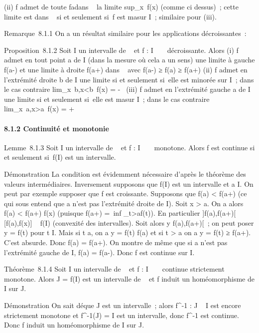\documentclass[]{article}
\begin{document}
(ii) f admet de toute fa\ccon dans
\overline{}~ la limite
sup\_x\inI~f(x) (comme ci dessus)~; cette
limite est dans ~ si et seulement si~f est ma sur I~; similaire
pour (iii).

Remarque~8.1.1 On a un résultat similaire pour les applications
décroissantes~:

Proposition~8.1.2 Soit I un intervalle de ~ et f : I \rightarrow~ ~ décroissante.
Alors (i) f admet en tout point a de I (dans la mesure où cela a un
sens) une limite à gauche f(a-) et une limite à droite f(a+) dans ~ avec
f(a-) ≥ f(a) ≥ f(a+) (ii) f admet en l'extrémité droite b de I une
limite si et seulement si~elle est minorée sur I~; dans le cas contraire
lim\_x\rightarrow~b,x\textless{}b~f(x) = -\infty~ (iii)
f admet en l'extrémité gauche a de I une limite si et seulement si~elle
est ma sur I~; dans le cas contraire
lim\_x\rightarrow~a,x\textgreater{}a~f(x) = +\infty~

\paragraph{8.1.2 Continuité et monotonie}

Lemme~8.1.3 Soit I un intervalle de ~ et f : I \rightarrow~ ~ monotone. Alors f est
continue si et seulement si~f(I) est un intervalle.

Démonstration La condition est évidemment nécessaire d'après le théorème
des valeurs intermédiaires. Inversement supposons que f(I) est un
intervalle et a \in I. On peut par exemple supposer que f est croissante.
Supposons que f(a) \textless{} f(a+) (ce qui sous entend que a n'est pas
l'extrémité droite de I). Soit x \textgreater{} a. On a alors f(a)
\textless{} f(a+) \leq f(x) (puisque f(a+) =\
inf \_t\textgreater{}af(t)). En particulier {]}f(a),f(a+){[}\subset~
{[}f(a),f(x){]} \subset~ f(I) (convexité des intervalles). Soit alors y
\in{]}f(a),f(a+){[}~; on peut poser y = f(t) pour t \in I. Mais si t \leq a, on
a y = f(t) \leq f(a) et si t \textgreater{} a on a y = f(t) ≥ f(a+). C'est
absurde. Donc f(a) = f(a+). On montre de même que si a n'est pas
l'extrémité gauche de I, f(a) = f(a-). Donc f est continue sur I.

Théorème~8.1.4 Soit I un intervalle de ~ et f : I \rightarrow~ ~ continue
strictement monotone. Alors J = f(I) est un intervalle de \mathbb{R}~ et f induit
un homéomorphisme de I sur J.

Démonstration On sait dé que J est un intervalle~; alors
f^-1 : J \rightarrow~ I est encore strictement monotone et
f^-1(J) = I est un intervalle, donc f^-1 est
continue. Donc f induit un homéomorphisme de I sur J.
\end{document}
